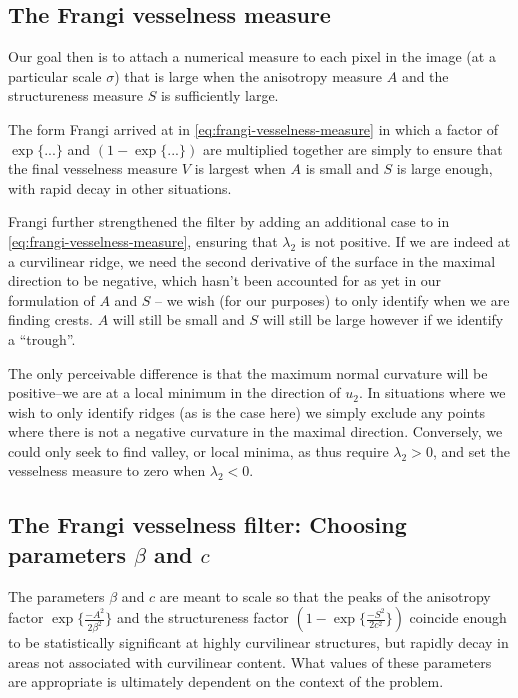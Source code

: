 \subsection{The Frangi vesselness measure}

Our goal then is to attach a numerical measure to each pixel in the image (at a particular scale $\sigma$) that is large when the anisotropy measure $A$ and the structureness measure $S$ is sufficiently large.

The form Frangi arrived at in \cref{eq:frangi-vesselness-measure} in which a factor of $\exp\{...\}$ and $(1 - \exp\{...\})$ are multiplied together are simply to ensure that the final vesselness measure $V$ is largest when $A$ is small and $S$ is large enough, with rapid decay in other situations.

Frangi further strengthened the filter by adding an additional case to in \cref{eq:frangi-vesselness-measure}, ensuring that $\lambda_2$ is not positive. If we are indeed at a curvilinear ridge, we need the second derivative of the surface in the maximal direction to be negative, which hasn't been accounted for as yet in our formulation of $A$ and $S$ -- we wish (for our purposes) to only identify when we are finding crests. $A$ will still be small and $S$ will still be large however if we identify a ``trough''.

The only perceivable difference is that the maximum normal curvature will be positive--we are at a local minimum in the direction of $u_2$. In situations where we wish to only identify ridges (as is the case here) we simply exclude any points where there is not a negative curvature in the maximal direction. Conversely, we could only seek to find valley, or local minima, as thus require $\lambda_2 > 0$, and set the vesselness measure to zero when $\lambda_2 < 0$.

\subsection{The Frangi vesselness filter: Choosing parameters $\beta$ and $c$}

The parameters $\beta$ and $c$ are meant to scale so that the peaks of the anisotropy factor $\exp\{\frac{-A^2}{2\beta^2}\}$ and the structureness factor $(1-\exp\{\frac{-S^2}{2c^2}\})$ coincide enough to be statistically significant at highly curvilinear structures, but rapidly decay in areas not associated with curvilinear content. What values of these parameters are appropriate is ultimately dependent on the context of the problem.

